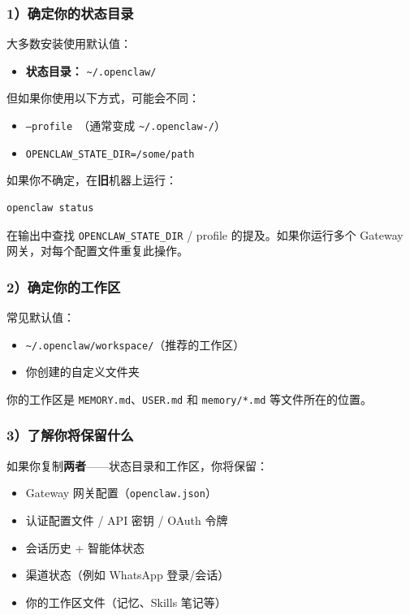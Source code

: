 \subsubsection{1）确定你的状态目录}


大多数安装使用默认值：

\begin{itemize}
  \item \textbf{状态目录：} \texttt{\textasciitilde{}/.openclaw/}
\end{itemize}


但如果你使用以下方式，可能会不同：

\begin{itemize}
  \item \texttt{--profile }（通常变成 \texttt{\textasciitilde{}/.openclaw-/}）
  \item \texttt{OPENCLAW\_STATE\_DIR=/some/path}
\end{itemize}


如果你不确定，在\textbf{旧}机器上运行：

\begin{lstlisting}[language=bash]
openclaw status
\end{lstlisting}


在输出中查找 \texttt{OPENCLAW\_STATE\_DIR} / profile 的提及。如果你运行多个 Gateway 网关，对每个配置文件重复此操作。

\subsubsection{2）确定你的工作区}


常见默认值：

\begin{itemize}
  \item \texttt{\textasciitilde{}/.openclaw/workspace/}（推荐的工作区）
  \item 你创建的自定义文件夹
\end{itemize}


你的工作区是 \texttt{MEMORY.md}、\texttt{USER.md} 和 \texttt{memory/*.md} 等文件所在的位置。

\subsubsection{3）了解你将保留什么}


如果你复制\textbf{两者}——状态目录和工作区，你将保留：

\begin{itemize}
  \item Gateway 网关配置（\texttt{openclaw.json}）
  \item 认证配置文件 / API 密钥 / OAuth 令牌
  \item 会话历史 + 智能体状态
  \item 渠道状态（例如 WhatsApp 登录/会话）
  \item 你的工作区文件（记忆、Skills 笔记等）
\end{itemize}


